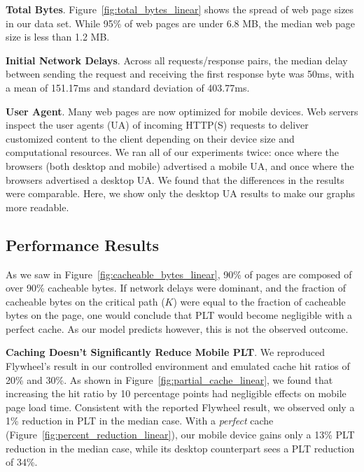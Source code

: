 \textbf{Total Bytes}. Figure~\ref{fig:total_bytes_linear} shows the spread of web page sizes in our data set. While 95\% of web pages are under 6.8 MB, the median web page size is less than 1.2 MB.

\textbf{Initial Network Delays}. Across all requests/response pairs, the median delay between sending the request and receiving the first response byte was 50ms, with a mean of 151.17ms and standard deviation of 403.77ms.

\textbf{User Agent}. Many web pages are now optimized for mobile devices. Web
servers inspect the user agents (UA) of incoming HTTP(S) requests to deliver
customized content to the client depending on their device size and
computational resources. We ran all of our experiments twice: once where the
browsers (both desktop and mobile) advertised a mobile UA, and once where the
browsers advertised a desktop UA. We found that the differences in the results
were comparable. Here, we show only the desktop UA results to make our graphs more readable.

\subsection{Performance Results}
As we saw in Figure~\ref{fig:cacheable_bytes_linear}, 90\% of pages are composed of over 90\% cacheable bytes.
If network delays were dominant, and the fraction of cacheable bytes on the critical path ($K$) were equal to the fraction of cacheable bytes on the page, one would conclude that PLT would become negligible with a perfect cache. As our model predicts however, this is not the observed outcome.

\textbf{Caching Doesn't Significantly Reduce Mobile PLT}.
We reproduced Flywheel's result in our controlled environment and emulated cache hit ratios of 20\% and 30\%. As shown in Figure~\ref{fig:partial_cache_linear}, we found that increasing the hit ratio by 10 percentage points had negligible effects on mobile page load time. Consistent with the reported Flywheel result, we observed only a 1\% reduction in PLT in the median case.
With a {\em perfect} cache (Figure~\ref{fig:percent_reduction_linear}), our mobile device gains only a 13\% PLT reduction
in the median case, while its desktop counterpart sees a PLT reduction of
34\%.

